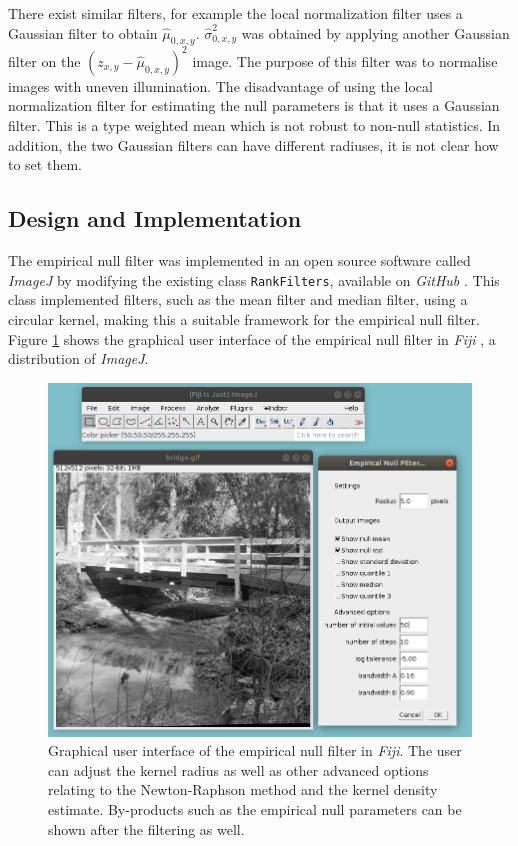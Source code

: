 There exist similar filters, for example the local normalization filter \citep{sage2003teaching, sage2018local} uses a Gaussian filter to obtain $\widehat{\mu}_{0,x,y}$. $\widehat{\sigma}_{0,x,y}^2$ was obtained by applying another Gaussian filter on the $\left(z_{x,y}-\widehat{\mu}_{0,x,y}\right)^2$ image. The purpose of this filter was to normalise images with uneven illumination. The disadvantage of using the local normalization filter for estimating the null parameters is that it uses a Gaussian filter. This is a type weighted mean which is not robust to non-null statistics. In addition, the two Gaussian filters can have different radiuses, it is not clear how to set them.

\subsection{Design and Implementation}

The empirical null filter was implemented in an open source software called \emph{ImageJ} \citep{abramoff2004image, schneider2012nih, perez2013image} by modifying the existing class \texttt{RankFilters}, available on \emph{GitHub} \citep{imagej2018rank}. This class implemented filters, such as the mean filter and median filter, using a circular kernel, making this a suitable framework for the empirical null filter. Figure \ref{fig:inference_fijiGui} shows the graphical user interface of the empirical null filter in \emph{Fiji} \citep{schindelin2012fiji}, a distribution of \emph{ImageJ}.

\begin{figure}
    \centering
    \includegraphics[width=\textwidth]{../figures/inference/fiji/gui.png}
    \caption{Graphical user interface of the empirical null filter in \emph{Fiji}. The user can adjust the kernel radius as well as other advanced options relating to the Newton-Raphson method and the kernel density estimate. By-products such as the empirical null parameters can be shown after the filtering as well.}
    \label{fig:inference_fijiGui}
\end{figure}

